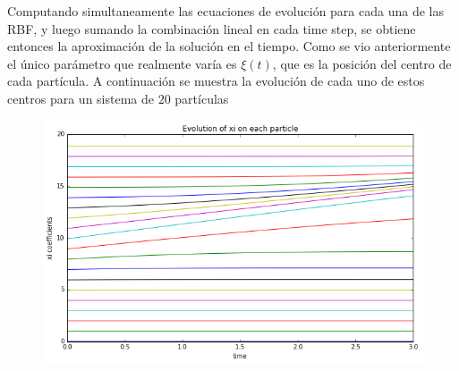 \documentclass[spanish]{article}
\begin{document}
    Computando simultaneamente las ecuaciones de evolución para cada una de las RBF, y luego sumando la combinación lineal en cada time step, se obtiene entonces la aproximación de la solución en el tiempo. Como se vio anteriormente el único parámetro que realmente varía es $\xi(t)$, que es la posición del centro de cada partícula. A continuación se muestra la evolución de cada uno de estos centros para un sistema de $20$ partículas
    \begin{figure}[H]
      \centering
      \includegraphics[scale=0.5]{xis.png}
    \end{figure}
    
\end{document}

